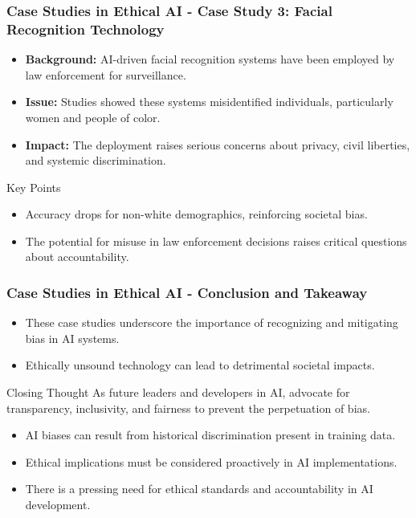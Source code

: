 \documentclass{beamer}
\begin{document}
\begin{frame}[fragile]
    \frametitle{Case Studies in Ethical AI - Case Study 3: Facial Recognition Technology}
    \begin{itemize}
        \item \textbf{Background:} AI-driven facial recognition systems have been employed by law enforcement for surveillance.
        \item \textbf{Issue:} Studies showed these systems misidentified individuals, particularly women and people of color.
        \item \textbf{Impact:} The deployment raises serious concerns about privacy, civil liberties, and systemic discrimination.
    \end{itemize}
    \begin{block}{Key Points}
        \begin{itemize}
            \item Accuracy drops for non-white demographics, reinforcing societal bias.
            \item The potential for misuse in law enforcement decisions raises critical questions about accountability.
        \end{itemize}
    \end{block}
\end{frame}

\begin{frame}[fragile]
    \frametitle{Case Studies in Ethical AI - Conclusion and Takeaway}
    \begin{itemize}
        \item These case studies underscore the importance of recognizing and mitigating bias in AI systems.
        \item Ethically unsound technology can lead to detrimental societal impacts.
    \end{itemize}
    \begin{block}{Closing Thought}
        As future leaders and developers in AI, advocate for transparency, inclusivity, and fairness to prevent the perpetuation of bias.
    \end{block}
    \begin{itemize}
        \item AI biases can result from historical discrimination present in training data.
        \item Ethical implications must be considered proactively in AI implementations.
        \item There is a pressing need for ethical standards and accountability in AI development.
    \end{itemize}
\end{frame}
\end{document}

